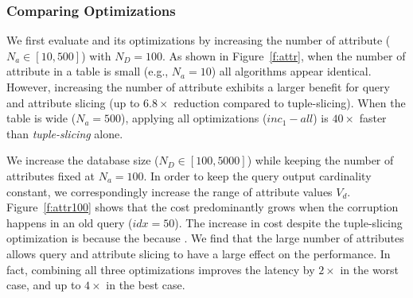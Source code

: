 \subsubsection{Comparing Optimizations}

We first evaluate \sys and its optimizations by increasing the number of attribute ($N_a \in [10, 500]$) with $N_D = 100$.
As shown in Figure~\ref{f:attr}, when the number of attribute in a table is small (e.g., $N_a=10$) all algorithms appear identical. 
However, increasing the number of attribute exhibits a larger benefit for query and attribute slicing (up to $6.8\times$ reduction compared to tuple-slicing).
When the table is wide ($N_a = 500$), applying all optimizations ($inc_1-all$) is $40\times$ faster than \emph{tuple-slicing} alone.  

We increase the database size ($N_D \in [100,5000]$) while keeping the number of attributes fixed at $N_a = 100$.
In order to keep the query output cardinality constant, we correspondingly increase the range of attribute values $V_d$.
Figure~\ref{f:attr100} shows that the cost predominantly grows when the corruption happens in an old query ($idx = 50$).
The increase in cost despite the tuple-slicing optimization is because the because .
We find that the large number of attributes allows query and attribute slicing to have a large effect on the performance.
In fact, combining all three optimizations improves the latency by $2\times$ in the worst case, and up to $4\times$ in the best case.


